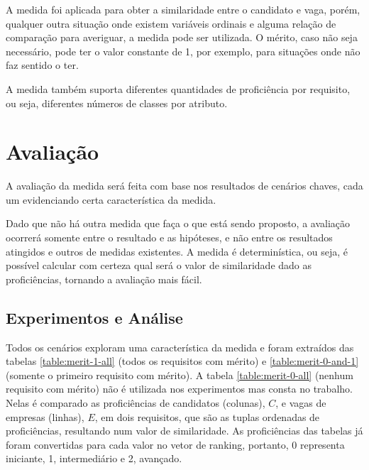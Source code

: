 \documentclass[preprint,12pt]{elsarticle}
\begin{document}
A medida foi aplicada para obter a similaridade entre o candidato e vaga, porém, qualquer outra situação onde existem variáveis ordinais e alguma relação de comparação para averiguar, a medida pode ser utilizada. O mérito, caso não seja necessário, pode ter o valor constante de 1, por exemplo, para situações onde não faz sentido o ter.

A medida também suporta diferentes quantidades de proficiência por requisito, ou seja, diferentes números de classes por atributo.

\section{Avaliação}
\label{sec:sample4}

A avaliação da medida será feita com base nos resultados de cenários chaves, cada um evidenciando certa característica da medida. 

Dado que não há outra medida que faça o que está sendo proposto, a avaliação ocorrerá somente entre o resultado e as hipóteses, e não entre os resultados atingidos e outros de medidas existentes. A medida é determinística, ou seja, é possível calcular com certeza qual será o valor de similaridade dado as proficiências, tornando a avaliação mais fácil.

\subsection{Experimentos e Análise}
\label{ssec:experiments}

Todos os cenários exploram uma característica da medida e foram extraídos das tabelas \ref{table:merit-1-all} (todos os requisitos com mérito) e \ref{table:merit-0-and-1} (somente o primeiro requisito com mérito). A tabela \ref{table:merit-0-all} (nenhum requisito com mérito) não é utilizada nos experimentos mas consta no trabalho. Nelas é comparado as proficiências de candidatos (colunas), $C$, e vagas de empresas (linhas), $E$, em dois requisitos, que são as tuplas ordenadas de proficiências, resultando num valor de similaridade. As proficiências das tabelas já foram convertidas para cada valor no vetor de ranking, portanto, 0 representa iniciante, 1, intermediário e 2, avançado. 
\end{document}
